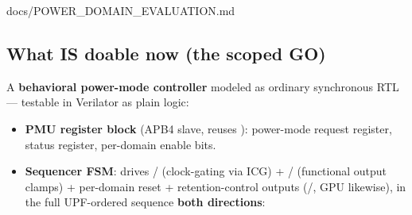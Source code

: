 \begin{relocated}{docs/POWER_DOMAIN_EVALUATION.md}
\subsection{What IS doable now (the scoped GO)}\label{tm:pd:power-domain-evaluation:3-what-is-doable-now-the-scoped-go}

A \textbf{behavioral power-mode controller} modeled as ordinary
synchronous RTL --- testable in Verilator as plain logic:

\begin{itemize}
\tightlist
\item
  \textbf{PMU register block} (APB4 slave, reuses
  ): power-mode request register, status
  register, per-domain enable bits.
\item
  \textbf{Sequencer FSM}: drives  / 
  (clock-gating via ICG) +  / 
  (functional output clamps) + per-domain reset + retention-control
  outputs (/, GPU likewise), in
  the full UPF-ordered sequence \textbf{both directions}:


\end{itemize}
\end{relocated}

